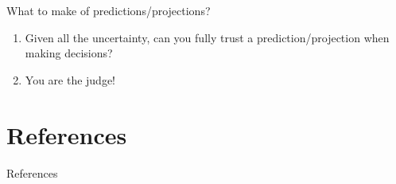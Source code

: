 \documentclass[table,xcolor=pdftex,dvipsnames, handout]{beamer}\usepackage[]{graphicx}\usepackage[]{color}
\begin{document}

\begin{frame}{What to make of predictions/projections?}
\begin{enumerate}[label=\textbullet]
    \item Given all the uncertainty, can you fully trust a prediction/projection when making decisions?
  \item You are the judge!
\end{enumerate}
\end{frame}


\section[References]{References}
\renewcommand\refname{References}
\def\newblock{References}
\begin{frame}{References}

%
\end{frame}


\end{document}
